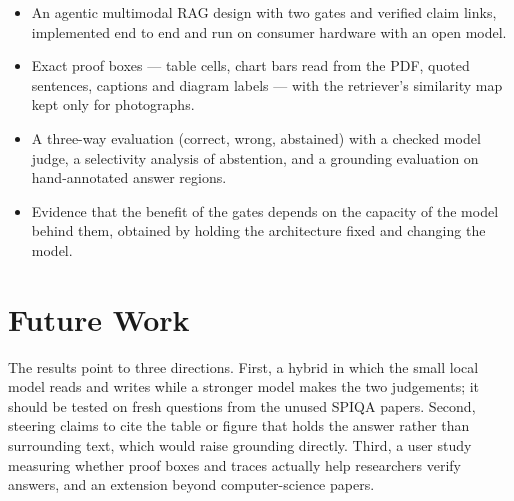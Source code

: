 \begin{itemize}
    \item An agentic multimodal RAG design with two gates and verified claim links,
    implemented end to end and run on consumer hardware with an open model.
    \item Exact proof boxes --- table cells, chart bars read from the PDF, quoted
    sentences, captions and diagram labels --- with the retriever's similarity map
    kept only for photographs.
    \item A three-way evaluation (correct, wrong, abstained) with a checked model judge,
    a selectivity analysis of abstention, and a grounding evaluation on hand-annotated
    answer regions.
    \item Evidence that the benefit of the gates depends on the capacity of the model
    behind them, obtained by holding the architecture fixed and changing the model.
\end{itemize}

\section{Future Work}

The results point to three directions. First, a hybrid in which the small local model
reads and writes while a stronger model makes the two judgements; it should be tested
on fresh questions from the unused SPIQA papers. Second, steering claims to cite the
table or figure that holds the answer rather than surrounding text, which would raise
grounding directly. Third, a user study measuring whether proof boxes and traces
actually help researchers verify answers, and an extension beyond computer-science
papers.
